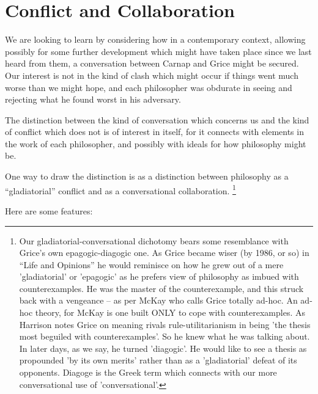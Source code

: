 \documentclass[10pt,titlepage]{book}
\begin{document}
\section{Conflict and Collaboration}

We are looking to learn by considering how in a contemporary context, allowing possibly for some further development which might have taken place since we last heard from them, a conversation between Carnap and Grice might be secured.
Our interest is not in the kind of clash which might occur if things went much worse than we might hope, and each philosopher was obdurate in seeing and rejecting what he found worst in his adversary.

The distinction between the kind of conversation which concerns us and the kind of conflict which does not is of interest in itself, for it connects with elements in the work of each philosopher, and possibly with ideals for how philosophy might be.

One way to draw the distinction is as a distinction between philosophy as a ``gladiatorial'' conflict and as a conversational collaboration.
\footnote{
Our gladiatorial-conversational dichotomy bears some resemblance with  
Grice's own epagogic-diagogic one. As Grice became wiser (by 1986, or so) in  
``Life and Opinions'' he would reminisce on how he grew out of a mere  
'gladiatorial' or 'epagogic' as he prefers view of philosophy as imbued with  
counterexamples.
He was the master of the counterexample, and this struck back  
with a vengeance -- as per McKay\cite{mackay72} who calls Grice totally ad-hoc.
An ad-hoc theory, for McKay is one built ONLY to cope with counterexamples.
As Harrison notes \cite{harrison79} Grice on meaning rivals rule-utilitarianism in being 'the thesis most beguiled with 
counterexamples'.
So he knew what he was talking about.
In later days, as we say, he turned  'diagogic'.
He would like to see a thesis as propounded 'by its own merits' rather than as a 'gladiatorial' defeat of its opponents.
Diagoge is the Greek  term which connects with our more conversational use of 'conversational'.}

Here are some features:
\end{document}
